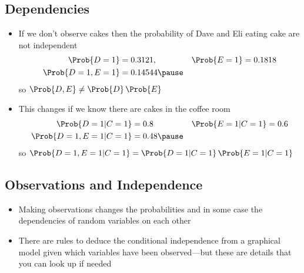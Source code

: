 \begin{slide}
\section[-1]{Dependencies}

\begin{PauseHighLight}
  \begin{itemize}
  \item If we don't observe cakes then the probability of Dave and Eli
    eating cake are not independent
    \begin{align*}
      \Prob{D=1} &= 0.3121, & \Prob{E=1} &= 0.1818 \\
      \Prob{D=1,E=1} &= 0.14544\pause
    \end{align*}
    so \(\Prob{D,E}\neq\Prob{D}\,\Prob{E}\)\pauseb
  \item This changes if we know there are cakes in the coffee room
    \begin{align*}
      \Prob{D=1|C=1} &= 0.8 & \Prob{E=1|C=1} &= 0.6 \\
      \Prob{D=1,E=1|C=1} &= 0.48\pause
    \end{align*}
    so $\Prob{D=1,E=1|C=1}= \Prob{D=1|C=1}\, \Prob{E=1|C=1}$\pauseb
  \end{itemize}
\end{PauseHighLight}

\end{slide}



\begin{slide}
\section[-2]{Observations and Independence}

\pb
\begin{itemize}
\item Making observations changes the probabilities and in some case the
  dependencies of random variables
  on each other\pauseh
\end{itemize}
\begin{center}
  \pause
\end{center}
\begin{itemize}
\item There are rules to deduce the conditional independence from a
  graphical model given which variables have been observed\pause---but
  these are details that you can look up if needed\pause
\end{itemize}
\end{slide}

